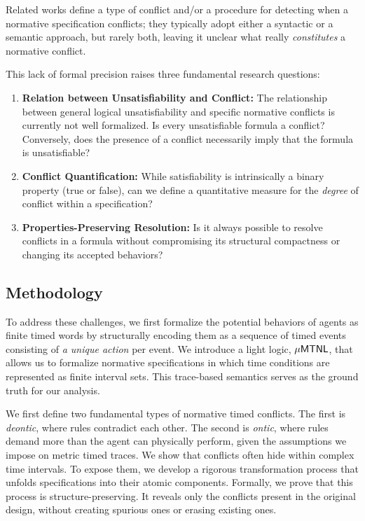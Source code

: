Related works define a type of conflict and/or a procedure for detecting when a normative specification conflicts; they typically adopt either a syntactic or a semantic approach, but rarely both, leaving it unclear what really \emph{constitutes} a normative conflict. 

This lack of formal precision raises three fundamental research questions:


\begin{enumerate}[RQ1]

  \item \textbf{Relation between Unsatisfiability and Conflict:} The relationship between general logical unsatisfiability and specific normative conflicts is currently not well formalized. Is every unsatisfiable formula a conflict? Conversely, does the presence of a conflict necessarily imply that the formula is unsatisfiable?

    

    \item \textbf{Conflict Quantification:} While satisfiability is intrinsically a binary property (true or false), can we define a quantitative measure for the \emph{degree} of conflict within a specification?

    

    \item \textbf{Properties-Preserving Resolution:} Is it always possible to resolve conflicts in a formula without compromising its structural compactness or changing its accepted behaviors?

\end{enumerate}

\subsection{Methodology}



To address these challenges, we first formalize the potential behaviors of agents as finite timed words by structurally encoding them as a sequence of timed events consisting of \emph{a unique action} per event. We introduce a light logic, $\mathsf{\mu MTNL}$, that allows us to formalize normative specifications in which time conditions are represented as finite interval sets. This trace-based semantics serves as the ground truth for our analysis.



We first define two fundamental types of normative timed conflicts. The first is \emph{deontic}, where rules contradict each other. The second is \emph{ontic}, where rules demand more than the agent can physically perform, given the assumptions we impose on metric timed traces. We show that conflicts often hide within complex time intervals. To expose them, we develop a rigorous transformation process that unfolds specifications into their atomic components. Formally, we prove that this process is structure-preserving. It reveals only the conflicts present in the original design, without creating spurious ones or erasing existing ones.



